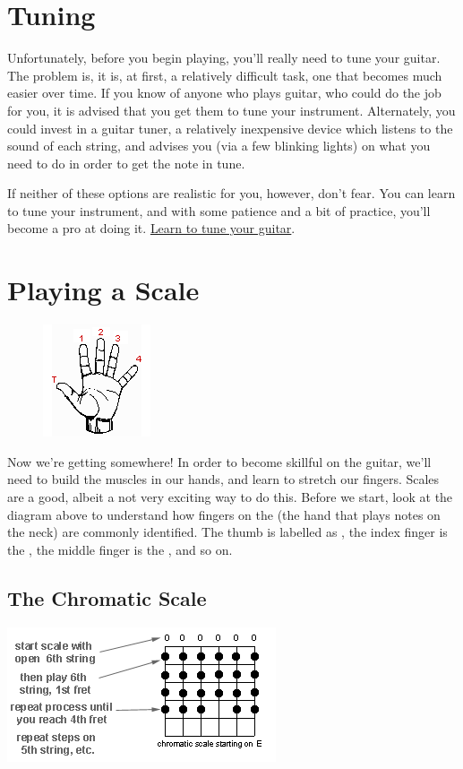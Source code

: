 \section{Tuning}
Unfortunately, before you begin playing, you'll really need to tune your
guitar. The problem is, it is, at first, a relatively difficult task, one that
becomes much easier over time. If you know of anyone who plays guitar, who
could do the job for you, it is advised that you get them to tune your
instrument. Alternately, you could invest in a guitar tuner, a relatively
inexpensive device which listens to the sound of each string, and advises you
(via a few blinking lights) on what you need to do in order to get the note in
tune.

If neither of these options are realistic for you, however, don't fear. You can
learn to tune your instrument, and with some patience and a bit of practice,
you'll become a pro at doing it.
\href{http://guitar.about.com/od/beginners/ss/how_tune_guitar.htm}{Learn to
tune your guitar}.

\section{Playing a Scale}
\begin{figure}
\includegraphics{partone/pickinghand.png}
\end{figure}

Now we're getting somewhere! In order to become skillful on the guitar, we'll
need to build the muscles in our hands, and learn to stretch our fingers.
Scales are a good, albeit a not very exciting way to do this. Before we start,
look at the diagram above to understand how fingers on the  (the
hand that plays notes on the neck) are commonly identified. The thumb is
labelled as , the index finger is the , the middle finger is
the , and so on. 

\subsection{The Chromatic Scale}
\includegraphics{partone/chromaticscale.png}

